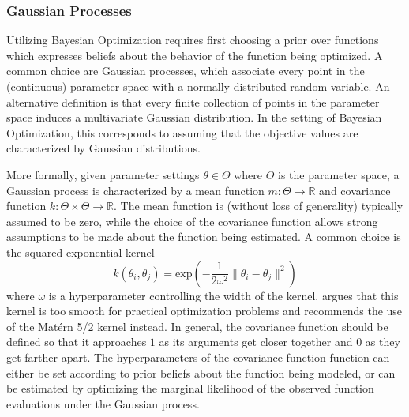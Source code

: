 \subsubsection{Gaussian Processes}

Utilizing Bayesian Optimization requires first choosing a prior over functions which expresses beliefs about the behavior of the function being optimized.
A common choice are Gaussian processes, which associate every point in the (continuous) parameter space with a normally distributed random variable.
An alternative definition is that every finite collection of points in the parameter space induces a multivariate Gaussian distribution.
In the setting of Bayesian Optimization, this corresponds to assuming that the objective values are characterized by Gaussian distributions.

More formally, given parameter settings $\theta \in \Theta$ where $\Theta$ is the parameter space, a Gaussian process is characterized by a mean function $m : \Theta \rightarrow \mathbb{R}$ and covariance function $k : \Theta \times \Theta \rightarrow \mathbb{R}$.
The mean function is (without loss of generality) typically assumed to be zero, while the choice of the covariance function allows strong assumptions to be made about the function being estimated.
A common choice is the squared exponential kernel
\begin{equation}
        k(\theta_i, \theta_j) = \mathrm{exp}\left(-\frac{1}{2\omega^2}\|\theta_i - \theta_j\|^2\right)
\end{equation}
where $\omega$ is a hyperparameter controlling the width of the kernel.
\cite{} argues that this kernel is too smooth for practical optimization problems and recommends the use of the Mat\'ern 5/2 kernel instead.
In general, the covariance function should be defined so that it approaches $1$ as its arguments get closer together and $0$ as they get farther apart.
The hyperparameters of the covariance function function can either be set according to prior beliefs about the function being modeled, or can be estimated by optimizing the marginal likelihood of the observed function evaluations under the Gaussian process.

